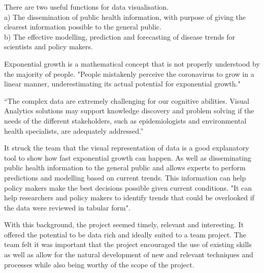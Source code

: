 There are two useful functions for data visualisation.\\
a) The dissemination of public health information, with purpose of giving the clearest information possible to the general public.\\
b) The effective modelling, prediction and forecasting of disease trends for scientists and policy makers.

\vspace{5mm}

Exponential growth is a mathematical concept that is not properly understood by the majority of people.
"People mistakenly perceive the coronavirus to grow in a linear manner, underestimating its actual potential for exponential growth."\cite{lammers2020correcting}\\

\vspace{2mm}

“The complex data are extremely challenging for our cognitive abilities. Visual Analytics solutions may support knowledge discovery and problem solving if the needs of the different stakeholders, such as epidemiologists and environmental health specialists, are adequately addressed.”\cite{preim2020survey}

\vspace{5mm}



It struck the team that the visual representation of data is a good explanatory tool to show how fast exponential growth can happen. As well as disseminating public health information to the general public and allows experts to perform predictions and modelling based on current trends. This information can help policy makers make the best decisions possible given current conditions. "It can help researchers and policy makers to identify trends that could be overlooked if the data were reviewed in tabular form". \cite{tebe2020covid19}

\vspace{5mm}







With this background, the project seemed timely, relevant and interesting.
It offered the potential to be data rich and ideally suited to a team project. The team felt it was important that the project encouraged the use of existing skills as well as allow for the natural development of new and relevant techniques and processes while also being worthy of the scope of the project.

